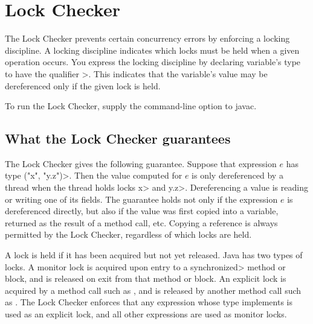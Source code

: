 \htmlhr
\chapter{Lock Checker\label{lock-checker}}

The Lock Checker prevents certain concurrency errors by enforcing a
locking discipline.  A locking discipline indicates which locks must be held
when a given operation occurs.  You express the locking discipline by
declaring variable's type to have the qualifier
\<>.
This indicates that the variable's value may
be dereferenced only if the given lock is held.


To run the Lock Checker, supply the
command-line option to javac.


\section{What the Lock Checker guarantees\label{lock-guarantees}}

The Lock Checker gives the following guarantee.
Suppose that expression $e$ has type
\<(\ttlcb"x", "y.z"\ttrcb)>.
Then the value computed for $e$ is only dereferenced by a thread when the
thread holds locks \<x> and \<y.z>.
Dereferencing a value is reading or writing one of its fields.
The guarantee holds not only if the expression $e$ is dereferenced
directly, but also if the value was first copied into a variable,
returned as the
result of a method call, etc.
Copying a reference is always
permitted by the Lock Checker, regardless of which locks are held.

A lock is held if it has been acquired but not yet released.
Java has two types of locks.
A monitor lock is acquired upon entry to a \<synchronized> method or block,
and is released on exit from that method or block.
An explicit lock is acquired by a method call such as
,
and is released by another method call such as
.
The Lock Checker enforces that any expression whose type implements
 is used as an
explicit lock, and all other expressions are used as monitor locks.

